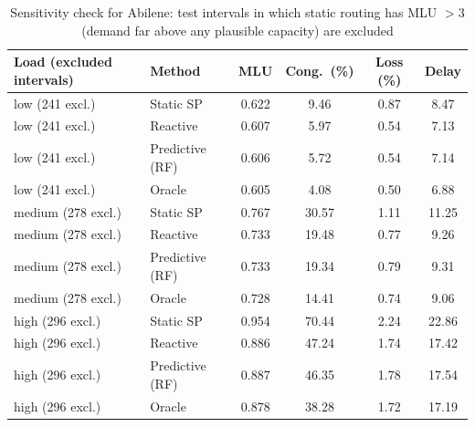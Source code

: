 \begin{table}[t]
\centering
\caption{Sensitivity check for Abilene: test intervals in which static routing has MLU $>3$ (demand far above any plausible capacity) are excluded}
\label{tab:sens}
\scriptsize
\begin{tabular}{@{}llcccc@{}}
\toprule
Load (excluded intervals) & Method & MLU & Cong.\ (\%) & Loss (\%) & Delay \\
\midrule
low (241 excl.) & Static SP & 0.622 & 9.46 & 0.87 & 8.47 \\
low (241 excl.) & Reactive & 0.607 & 5.97 & 0.54 & 7.13 \\
low (241 excl.) & Predictive (RF) & 0.606 & 5.72 & 0.54 & 7.14 \\
low (241 excl.) & Oracle & 0.605 & 4.08 & 0.50 & 6.88 \\
medium (278 excl.) & Static SP & 0.767 & 30.57 & 1.11 & 11.25 \\
medium (278 excl.) & Reactive & 0.733 & 19.48 & 0.77 & 9.26 \\
medium (278 excl.) & Predictive (RF) & 0.733 & 19.34 & 0.79 & 9.31 \\
medium (278 excl.) & Oracle & 0.728 & 14.41 & 0.74 & 9.06 \\
high (296 excl.) & Static SP & 0.954 & 70.44 & 2.24 & 22.86 \\
high (296 excl.) & Reactive & 0.886 & 47.24 & 1.74 & 17.42 \\
high (296 excl.) & Predictive (RF) & 0.887 & 46.35 & 1.78 & 17.54 \\
high (296 excl.) & Oracle & 0.878 & 38.28 & 1.72 & 17.19 \\
\bottomrule
\end{tabular}
\end{table}
